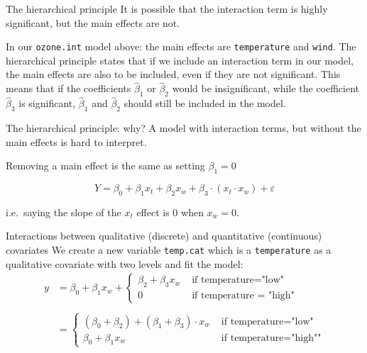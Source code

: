 \documentclass[
  ignorenonframetext,
]{beamer}
\begin{document}
\begin{frame}[fragile]
\begin{block}{The hierarchical principle}
\label{the-hierarchical-principle}
It is possible that the interaction term is highly significant, but the
main effects are not.

In our \texttt{ozone.int} model above: the main effects are
\texttt{temperature} and \texttt{wind}. The hierarchical principle
states that if we include an interaction term in our model, the main
effects are also to be included, even if they are not significant. This
means that if the coefficients \(\hat \beta_1\) or \(\hat \beta_2\)
would be insignificant, while the coefficient \(\hat \beta_3\) is
significant, \(\hat \beta_1\) and \(\hat \beta_2\) should still be
included in the model.
\end{block}
\end{frame}

\begin{frame}
\begin{block}{The hierarchical principle: why?}
\label{the-hierarchical-principle-why}
A model with interaction terms, but without the main effects is hard to
interpret.

Removing a main effect is the same as setting \(\beta_1=0\)

\[
Y = \beta_0 +  \beta_1 x_t + \beta_2 x_w + \beta_3\cdot(x_t  \cdot x_w) +\varepsilon
\]

i.e.~saying the slope of the \(x_t\) effect is 0 when \(x_w = 0\).
\end{block}
\end{frame}

\begin{frame}[fragile]
\begin{block}{Interactions between qualitative (discrete) and
quantitative (continuous) covariates}
\label{interactions-between-qualitative-discrete-and-quantitative-continuous-covariates}
We create a new variable \texttt{temp.cat} which is a
\texttt{temperature} as a qualitative covariate with two levels and fit
the model:
\[\begin{aligned}y&=\beta_0 + \beta_1 x_w + \begin{cases} \beta_2 + \beta_3  x_w  &\text{ if temperature="low"}\\ 0 &\text{ if temperature = "high"}\end{cases} \\\\ &= \begin{cases} (\beta_0 + \beta_2) + (\beta_1 + \beta_3) \cdot x_w &\text{ if temperature="low"}\\ \beta_0 + \beta_1 x_w &\text{ if temperature="high""} \end{cases} \end{aligned}\]
\end{block}
\end{frame}
\end{document}
